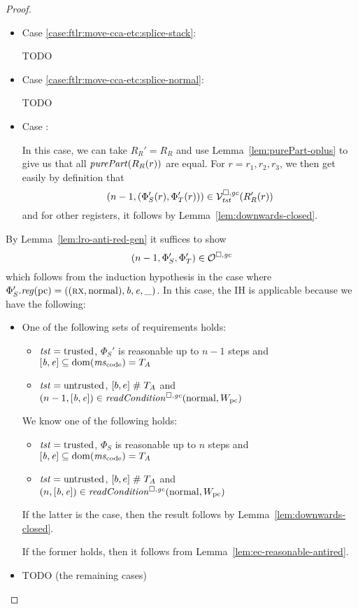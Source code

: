 \begin{proof}
\begin{itemize}
  \item Case \ref{case:ftlr:move-cca-etc:splice-stack}:

TODO
  \item Case \ref{case:ftlr:move-cca-etc:splice-normal}:

TODO
  \item Case \label{case:ftlr:move-cca-etc:splice-seal}:

    In this case, we can take $R_R' = R_R$ and use Lemma~\ref{lem:purePart-oplus} to give us that all $\purePart{R_R(r)}$ are equal.
    For $r = r_1, r_2, r_3$, we then get easily by definition that
    \[
      \npair[n-1]{(\Phi_S'(r), \Phi_T'(r))} \in \lrvg{\trust}(R_R'(r))
    \]
    and for other registers, it follows by Lemma~\ref{lem:downwards-closed}.
  \end{itemize}


  By Lemma~\ref{lem:lro-anti-red-gen} it suffices to show
  \[
    \npair[n-1]{\Phi_S',\Phi_T'} \in \lro
  \]
  which follows from the induction hypothesis in the case where $\Phi_S'.\reg(\pcreg) = ((\rx,\normal),\baddr,\eaddr,\_)$.
  In this case, the IH is applicable because we have the following:
  \begin{itemize}
  \item One of the following sets of requirements holds:
    \begin{itemize}
    \item $\trust = \trusted$, $\Phi_S'$ is reasonable up to $n-1$ steps and $[\baddr,\eaddr] \subseteq \dom(\mscode) = \ta$
    \item $\trust = \untrusted$, $[b,e] \mathrel{\#} \ta$ and $\npair[n-1]{[\baddr,\eaddr]} \in \readCond{\normal,W_\pcreg}$
    \end{itemize}

    We know one of the following holds:
    \begin{itemize}
    \item $\trust = \trusted$, $\Phi_S$ is reasonable up to $n$ steps and $[\baddr,\eaddr] \subseteq \dom(\mscode) = \ta$
    \item $\trust = \untrusted$, $[b,e] \mathrel{\#} \ta$ and $\npair{[\baddr,\eaddr]} \in \readCond{\normal,W_\pcreg}$
    \end{itemize}
    If the latter is the case, then the result follows by Lemma~\ref{lem:downwards-closed}.

    If the former holds, then it follows from Lemma~\ref{lem:ec-reasonable-antired}.

    \item TODO (the remaining cases)
  \end{itemize}


\end{proof}
